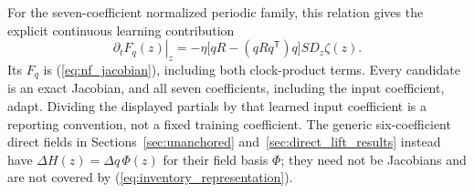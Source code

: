 For the seven-coefficient normalized periodic family, this relation gives
the explicit continuous learning contribution
\begin{equation}
 \left.\partial_t F_q(z)\right|_z
 =-\eta\bigl[qR-(qRq^{\mathsf T})q\bigr]S D_z\zeta(z).
 \label{eq:inventory_normalized_partials}
\end{equation}
Its $F_q$ is (\ref{eq:nf_jacobian}), including both clock-product terms.
Every candidate is an exact Jacobian, and all seven coefficients, including
the input coefficient, adapt. Dividing the displayed partials by that
learned input coefficient is a reporting convention, not a fixed training
coefficient. The generic six-coefficient direct fields in
Sections~\ref{sec:unanchored} and~\ref{sec:direct_lift_results} instead have
$\Delta H(z)=\Delta q\,\Phi(z)$ for their field basis $\Phi$; they need not
be Jacobians and are not covered by (\ref{eq:inventory_representation}).

